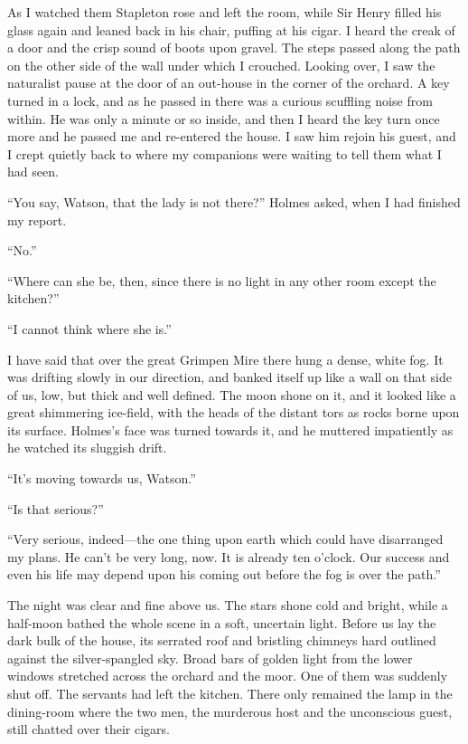 \documentclass[paper=5.5in:8.5in,BCOR=7mm,twoside,DIV=calc,12pt,usegeometry,openany,chapterprefix,endperiod]{scrbook} %
\begin{document}

As I watched them Stapleton rose and left the room, while Sir Henry filled his glass again and leaned back in his chair, puffing at his cigar. I heard the creak of a door and the crisp sound of boots upon gravel. The steps passed along the path on the other side of the wall under which I crouched. Looking over, I saw the naturalist pause at the door of an out-house in the corner of the orchard. A key turned in a lock, and as he passed in there was a curious scuffling noise from within. He was only a minute or so inside, and then I heard the key turn once more and he passed me and re-entered the house. I saw him rejoin his guest, and I crept quietly back to where my companions were waiting to tell them what I had seen.

\enquote{You say, Watson, that the lady is not there?} Holmes asked, when I had finished my report.

\enquote{No.}

\enquote{Where can she be, then, since there is no light in any other room except the kitchen?}

\enquote{I cannot think where she is.}

I have said that over the great Grimpen Mire there hung a dense, white fog. It was drifting slowly in our direction, and banked itself up like a wall on that side of us, low, but thick and well defined. The moon shone on it, and it looked like a great shimmering ice-field, with the heads of the distant tors as rocks borne upon its surface. Holmes's face was turned towards it, and he muttered impatiently as he watched its sluggish drift.

\enquote{It's moving towards us, Watson.}

\enquote{Is that serious?}

\enquote{Very serious, indeed\nobreakdash---the one thing upon earth which could have disarranged my plans. He can't be very long, now. It is already ten o'clock. Our success and even his life may depend upon his coming out before the fog is over the path.}

The night was clear and fine above us. The stars shone cold and bright, while a half-moon bathed the whole scene in a soft, uncertain light. Before us lay the dark bulk of the house, its serrated roof and bristling chimneys hard outlined against the silver-spangled sky. Broad bars of golden light from the lower windows stretched across the orchard and the moor. One of them was suddenly shut off. The servants had left the kitchen. There only remained the lamp in the dining-room where the two men, the murderous host and the unconscious guest, still chatted over their cigars.
\end{document}
